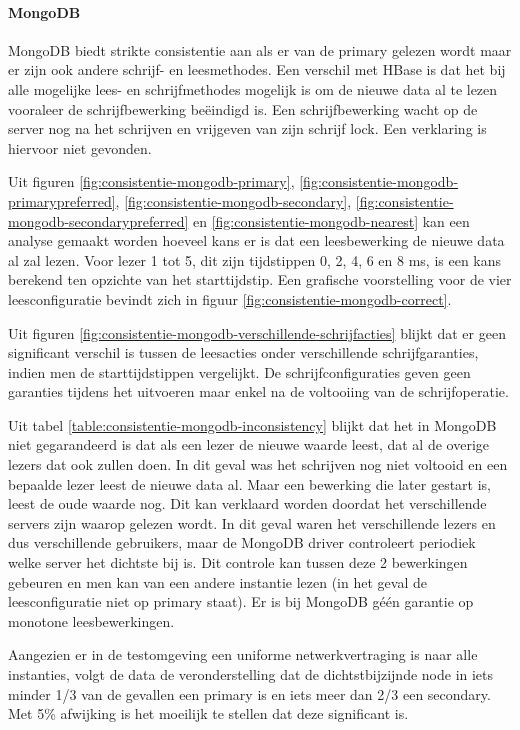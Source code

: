 \paragraph{MongoDB} MongoDB biedt strikte consistentie aan als er van de primary gelezen wordt maar er zijn ook andere schrijf- en leesmethodes. Een verschil met HBase is dat het bij alle mogelijke lees- en schrijfmethodes mogelijk is om de nieuwe data al te lezen vooraleer de schrijfbewerking beëindigd is. Een schrijfbewerking wacht op de server nog na het schrijven en vrijgeven van zijn schrijf lock. Een verklaring is hiervoor niet gevonden.

Uit figuren \ref{fig:consistentie-mongodb-primary}, \ref{fig:consistentie-mongodb-primarypreferred}, \ref{fig:consistentie-mongodb-secondary}, \ref{fig:consistentie-mongodb-secondarypreferred} en \ref{fig:consistentie-mongodb-nearest} kan een analyse gemaakt worden hoeveel kans er is dat een leesbewerking de nieuwe data al zal lezen. Voor lezer 1 tot 5, dit zijn tijdstippen 0, 2, 4, 6 en 8 ms, is een kans berekend ten opzichte van het starttijdstip. Een grafische voorstelling voor de vier leesconfiguratie bevindt zich in figuur \ref{fig:consistentie-mongodb-correct}. 

Uit figuren \ref{fig:consistentie-mongodb-verschillende-schrijfacties} blijkt dat er geen significant verschil is tussen de leesacties onder verschillende schrijfgaranties, indien men de starttijdstippen vergelijkt. De schrijfconfiguraties geven geen garanties tijdens het uitvoeren maar enkel na de voltooiing van de schrijfoperatie.  

Uit tabel \ref{table:consistentie-mongodb-inconsistency} blijkt dat het in MongoDB niet gegarandeerd is dat als een lezer de nieuwe waarde leest, dat al de overige lezers dat ook zullen doen. In dit geval was het schrijven nog niet voltooid en een bepaalde lezer leest de nieuwe data al. Maar een bewerking die later gestart is, leest de oude waarde nog. Dit kan verklaard worden doordat het verschillende servers zijn waarop gelezen wordt. In dit geval waren het verschillende lezers en dus verschillende gebruikers, maar de MongoDB driver controleert periodiek welke server het dichtste bij is. Dit controle kan tussen deze 2 bewerkingen gebeuren en men kan van een andere instantie lezen (in het geval de leesconfiguratie niet op primary staat). Er is bij MongoDB géén garantie op monotone leesbewerkingen. 

Aangezien er in de testomgeving een uniforme netwerkvertraging is naar alle instanties, volgt de data de veronderstelling dat de dichtstbijzijnde node in iets minder 1/3 van de gevallen een primary is en iets meer dan 2/3 een secondary. Met 5\% afwijking is het moeilijk te stellen dat deze significant is. 


